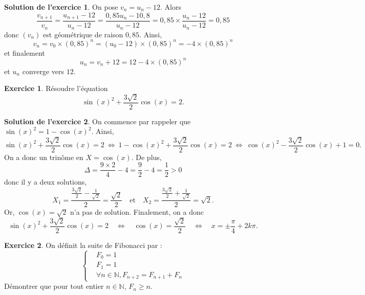 \documentclass[a4paper, 11pt,openany]{article}%
\theoremstyle{plain}
\theoremstyle{definition}
\newtheorem{exo}{Exercice}
\newtheorem{sol}{Solution de l'exercice}
\theoremstyle{remark}
\newcommand{\N}{\mathbb{N}}
\begin{document}
\begin{sol}
On pose $v_n = u_n - 12$. Alors
\[ \frac{v_{n+1}}{v_n} = \frac{u_{n+1} - 12}{u_{n} - 12} = \frac{0,85u_{n} - 10,8}{u_{n} - 12} = 0,85 \times \frac{u_{n} - 12}{u_{n} - 12} = 0,85\]
donc $(v_n)$ est géométrique de raison $0,85$. Ainsi,
\[ v_n = v_0 \times (0,85)^n =(u_0 - 12) \times (0,85)^n = - 4 \times (0,85)^n\]
et finalement
\[ u_n = v_n +12 = 12 - 4 \times (0,85)^n\]
et $u_n$ converge vers $12$.
\end{sol}




\begin{exo}
Résoudre l'équation 
\[ \sin(x)^2 + \frac{3\sqrt{2}}{2} \cos(x) =2.\]
\end{exo}
%
\begin{sol}
On commence par rappeler que $\sin(x)^2 = 1 -\cos(x)^2$. Ainsi,
\[ \sin(x)^2 + \frac{3\sqrt{2}}{2} \cos(x) =2 \ \Leftrightarrow \  1 -\cos(x)^2 + \frac{3\sqrt{2}}{2} \cos(x) =2 \ \Leftrightarrow \  \cos(x)^2 - \frac{3\sqrt{2}}{2} \cos(x) +1 = 0. \]
On a donc un trinôme en $X = \cos(x)$. De plus,
\[ \Delta = \frac{9 \times 2}{4} - 4 =  \frac{9}{2} - 4 = \frac{1}{2} > 0\]
donc il y a deux solutions,
\[ X_1 = \frac{\frac{3\sqrt{2}}{2} - \frac{1}{\sqrt{2}}}{2} = \frac{\sqrt{2}}{2} \quad \text{et} \quad X_2 = \frac{\frac{3\sqrt{2}}{2} + \frac{1}{\sqrt{2}}}{2} = \sqrt{2}.\]
Or, $\cos(x) = \sqrt{2}$ n'a pas de solution. Finalement, on a donc
\[ \sin(x)^2 + \frac{3\sqrt{2}}{2} \cos(x) =2 \quad \Leftrightarrow \quad \cos(x) = \frac{\sqrt{2}}{2} \quad \Leftrightarrow \quad x = \pm \frac{\pi}{4} + 2 k \pi.\]
\end{sol}

\begin{exo}
 On définit la suite de Fibonacci par : $$\begin{cases}
                                                 &F_0=1\\&F_1=1\\ &\forall n\in \mathbb N, F_{n+2}=F_{n+1}+F_n
                                                \end{cases}$$
 Démontrer que pour tout entier $n\in \N$, $F_n\geqslant n$.
\end{exo}
\end{document}
